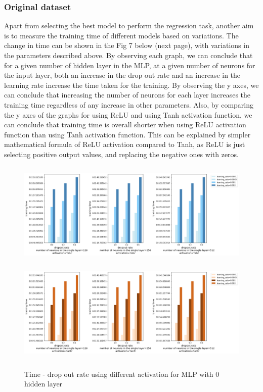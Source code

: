 \documentclass[letterpaper, 12 pt, conference]{ieeeconf}  %
\begin{document}
\subsubsection{Original dataset}
Apart from selecting the best model to perform the regression task, another aim is to measure the training time of different models based on variations. The change in time can be shown in the Fig 7 below (next page), with variations in the parameters described above. By observing each graph, we can conclude that for a given number of hidden layer in the MLP, at a given number of neurons for the input layer, both an increase in the drop out rate and an increase in the learning rate increase the time taken for the training. By observing the y axes, we can conclude that increasing the number of neurons for each layer increases the training time regardless of any increase in other parameters. Also, by comparing the y axes of the graphs for using ReLU and using Tanh activation function, we can conclude that training time is overall shorter when using ReLU activation function than using Tanh activation function. This can be explained by simpler mathematical formula of ReLU activation compared to Tanh, as ReLU is just selecting positive output values, and replacing the negative ones with zeros.
\begin{figure}[h]
	\includegraphics[width=18cm, height=5cm]{./figs/time-relu.png}\\
		\includegraphics[width=18cm, height=5cm]{./figs/time-tanh-layer1.png}
	\caption{Time - drop out rate using different activation for MLP with 0 hidden layer}
	\label{fig:boat1}
\end{figure}\\
\end{document}
